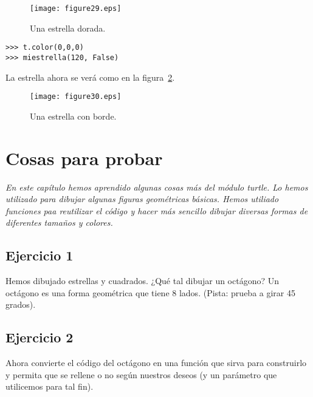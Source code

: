 \begin{figure}
\begin{center}
\texttt{[image: figure29.eps]}
\end{center}
\caption{Una estrella dorada.}\label{fig29}
\end{figure}

\begin{listing}
\begin{verbatim}
>>> t.color(0,0,0)
>>> miestrella(120, False)
\end{verbatim}
\end{listing}

\noindent
La estrella ahora se verá como en la figura~\ref{fig30}.

\begin{figure}
\begin{center}
\texttt{[image: figure30.eps]}
\end{center}
\caption{Una estrella con borde.}\label{fig30}
\end{figure}

\section{Cosas para probar}

\emph{En este capítulo hemos aprendido algunas cosas más del módulo turtle. Lo hemos utilizado para dibujar algunas figuras geométricas básicas. Hemos utiliado funciones paa reutilizar el código y hacer más sencillo dibujar diversas formas de diferentes tamaños y colores.}

\subsection*{Ejercicio 1}
Hemos dibujado estrellas y cuadrados. ¿Qué tal dibujar un octágono? Un octágono es una forma geométrica que tiene 8 lados.
(Pista: prueba a girar 45 grados).

\subsection*{Ejercicio 2}
Ahora convierte el código del octágono en una función que sirva para construirlo y permita que se rellene o no según nuestros deseos (y un parámetro que utilicemos para tal fin).

\newpage

